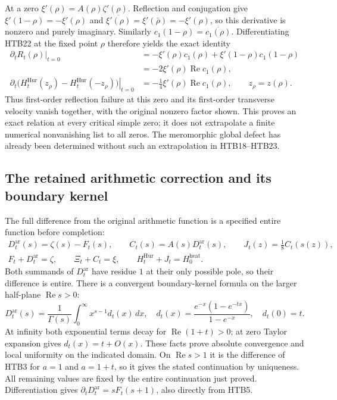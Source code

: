 At a zero $\xi'(\rho)=A(\rho)\zeta'(\rho)$. Reflection and conjugation
give $\xi'(1-\rho)=-\xi'(\rho)$ and
$\overline{\xi'(\rho)}=\xi'(\bar\rho)=-\xi'(\rho)$, so this derivative
is nonzero and purely imaginary. Similarly
$c_1(1-\rho)=\overline{c_1(\rho)}$. Differentiating HTB22 at the fixed
point $\rho$ therefore yields the exact identity
\begin{equation}\tag{HTB25}
\begin{split}
 \left.\partial_tR_t(\rho)\right|_{t=0}
 &=-\xi'(\rho)c_1(\rho)
     +\xi'(1-\rho)c_1(1-\rho)\\
 &=-2\xi'(\rho)\operatorname{Re}c_1(\rho),\\
 \left.\partial_t\bigl(H_t^{\mathrm{Hur}}(z_\rho)
                 -H_t^{\mathrm{Hur}}(-z_\rho)\bigr)\right|_{t=0}
 &=-\frac14\xi'(\rho)\operatorname{Re}c_1(\rho),
 \qquad z_\rho=z(\rho).
\end{split}
\end{equation}
Thus first-order reflection failure at this zero and its first-order
transverse velocity vanish together, with the original nonzero factor
shown. This proves an exact relation at every critical simple zero;
it does not extrapolate a finite numerical nonvanishing list to all
zeros. The meromorphic global defect has already been determined
without such an extrapolation in HTB18--HTB23.

\subsection{The retained arithmetic correction and its boundary kernel}

The full difference from the original arithmetic function is a
specified entire function before completion:
\begin{equation}\tag{HTB26}
\begin{gathered}
 D_t^{\mathrm{ar}}(s)=\zeta(s)-F_t(s),\qquad
 C_t(s)=A(s)D_t^{\mathrm{ar}}(s),\qquad
 J_t(z)=\frac18C_t(s(z)),\\
 F_t+D_t^{\mathrm{ar}}=\zeta,\qquad
 \Xi_t+C_t=\xi,\qquad
 H_t^{\mathrm{Hur}}+J_t=H_0^{\mathrm{heat}}.
\end{gathered}
\end{equation}
Both summands of $D_t^{\mathrm{ar}}$ have residue $1$ at their only
possible pole, so their difference is entire. There is a convergent
boundary-kernel formula on the larger half-plane
$\operatorname{Re}s>0$:
\begin{equation}\tag{HTB27}
 D_t^{\mathrm{ar}}(s)=\frac1{\Gamma(s)}
   \int_0^{\infty}x^{s-1}d_t(x)\,dx,
 \quad
 d_t(x)=\frac{e^{-x}(1-e^{-t x})}{1-e^{-x}},\quad d_t(0)=t.
\end{equation}
At infinity both exponential terms decay for $\operatorname{Re}(1+t)>0$;
at zero Taylor expansion gives $d_t(x)=t+O(x)$. These facts prove
absolute convergence and local uniformity on the indicated domain.
On $\operatorname{Re}s>1$ it is the difference of HTB3 for $a=1$ and
$a=1+t$, so it gives the stated continuation by uniqueness. All
remaining values are fixed by the entire continuation just proved.
Differentiation gives
$\partial_tD_t^{\mathrm{ar}}=sF_t(s+1)$, also directly from HTB5.

